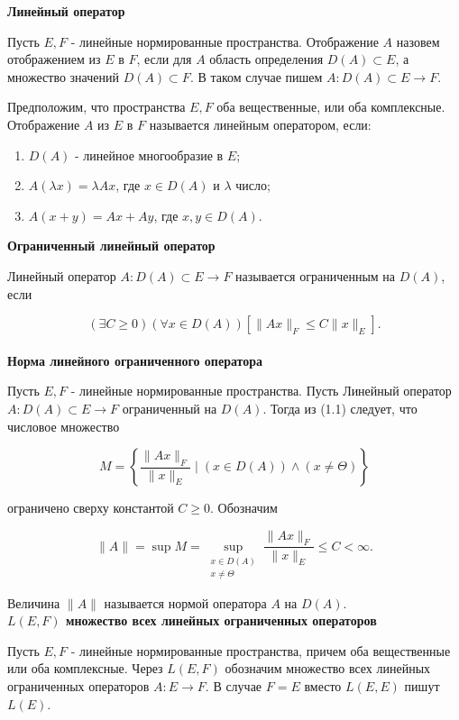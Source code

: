


\textbf{Линейный оператор}

Пусть $E, F$ - линейные нормированные пространства. Отображение $A$ назовем отображением из $E$ в $F$, если для $A$ область определения $D(A) \subset E$, а множество значений $D(A) \subset F$. В таком случае пишем $A: D(A) \subset E \rightarrow F$.

Предположим, что пространства $E, F$ оба вещественные, или оба комплексные. Отображение $A$ из $E$ в $F$ называется линейным оператором, если:

\begin{enumerate}
	\item $D(A)$ - линейное многообразие в $E$;

	\item $A(\lambda x)=\lambda A x$, где $x \in D(A)$ и $\lambda$ число;

	\item $A(x+y)=A x+A y$, где $x, y \in D(A)$.
\end{enumerate}

\textbf{Ограниченный линейный оператор}

Линейный оператор $A: D(A) \subset E \rightarrow F$ называется ограниченным на $D(A)$, если

$$
	(\exists C \geq 0)(\forall x \in D(A))\left[\|A x\|_{F} \leq C\|x\|_{E}\right] .
$$\\

\textbf{Норма линейного ограниченного оператора}

Пусть $E, F$ - линейные нормированные пространства. Пусть Линейный оператор $A: D(A) \subset E \rightarrow F$ ограниченный на $D(A)$. Тогда из (1.1) следует, что числовое множество

$$
	M=\left\{\frac{\|A x\|_{F}}{\|x\|_{E}} \mid(x \in D(A)) \wedge(x \neq \Theta)\right\}
$$

ограничено сверху константой $C \geq 0$. Обозначим

$$
	\|A\|=\sup M=\sup _{\substack{x \in D(A) \\ x \neq \Theta}} \frac{\|A x\|_{F}}{\|x\|_{E}} \leq C<\infty .
$$

Величина $\|A\|$ называется нормой оператора $A$ на $D(A)$.\\

\textbf{$L(E, F)$ множество всех линейных ограниченных операторов}

Пусть $E, F$ - линейные нормированные пространства, причем оба вещественные или оба комплексные. Через $L(E, F)$ обозначим множество всех линейных ограниченных операторов $A: E \rightarrow F$. В случае $F=E$ вместо $L(E, E)$ пишут $L(E)$.

